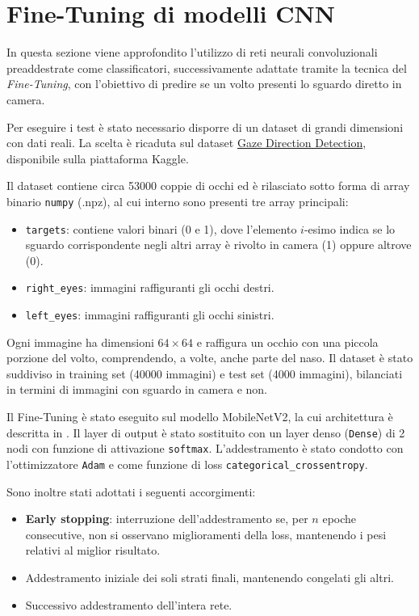 \documentclass[12pt,a4paper,openright,twoside]{book}
\begin{document}
\section{Fine-Tuning di modelli CNN}
\label{chap:mobilenetv2_ft}

In questa sezione viene approfondito l'utilizzo di reti neurali convoluzionali preaddestrate come classificatori, successivamente adattate tramite la tecnica del \textit{Fine-Tuning}, con l'obiettivo di predire se un volto presenti lo sguardo diretto in camera.  

Per eseguire i test è stato necessario disporre di un dataset di grandi dimensioni con dati reali. La scelta è ricaduta sul dataset \href{https://www.kaggle.com/datasets/estopadilla/gaze-direction-detection}{Gaze Direction Detection}, disponibile sulla piattaforma Kaggle.  

Il dataset contiene circa 53000 coppie di occhi ed è rilasciato sotto forma di array binario \texttt{numpy} (.npz), al cui interno sono presenti tre array principali:
\begin{itemize}
    \item \texttt{targets}: contiene valori binari (0 e 1), dove l'elemento $i$-esimo indica se lo sguardo corrispondente negli altri array è rivolto in camera (1) oppure altrove (0).
    \item \texttt{right\_eyes}: immagini raffiguranti gli occhi destri.
    \item \texttt{left\_eyes}: immagini raffiguranti gli occhi sinistri.
\end{itemize}

Ogni immagine ha dimensioni \(64 \times 64\) e raffigura un occhio con una piccola porzione del volto, comprendendo, a volte, anche parte del naso.  
Il dataset è stato suddiviso in training set (40000 immagini) e test set (4000 immagini), bilanciati in termini di immagini con sguardo in camera e non.  

Il Fine-Tuning è stato eseguito sul modello MobileNetV2, la cui architettura è descritta in \cite{Sandler2018MobileNetV2IR}. Il layer di output è stato sostituito con un layer denso (\texttt{Dense}) di 2 nodi con funzione di attivazione \texttt{softmax}. L'addestramento è stato condotto con l’ottimizzatore \texttt{Adam} e come funzione di loss \texttt{categorical\_crossentropy}.  

Sono inoltre stati adottati i seguenti accorgimenti:
\begin{itemize}
    \item \textbf{Early stopping}: interruzione dell'addestramento se, per $n$ epoche consecutive, non si osservano miglioramenti della loss, mantenendo i pesi relativi al miglior risultato.
    \item Addestramento iniziale dei soli strati finali, mantenendo congelati gli altri.
    \item Successivo addestramento dell'intera rete.
\end{itemize}
\end{document}
